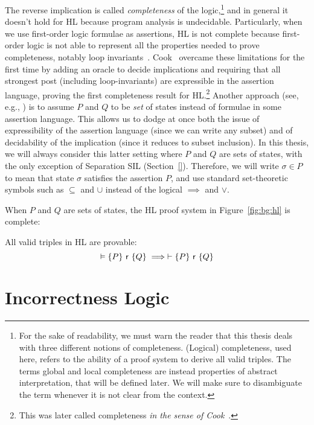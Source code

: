 The reverse implication is called \emph{completeness} of the logic,\footnote{For the sake of readability, we must warn the reader that this thesis deals with three different notions of completeness. (Logical) completeness, used here, refers to the ability of a proof system to derive all valid triples. The terms global and local completeness are instead properties of abstract interpretation, that will be defined later. We will make sure to disambiguate the term whenever it is not clear from the context.} and in general it doesn't hold for HL because program analysis is undecidable. Particularly, when we use first-order logic formulae as assertions, HL is not complete because first-order logic is not able to represent all the properties needed to prove completeness, notably loop invariants~\cite[§2.7]{Apt81}.
Cook~\cite{Cook78} overcame these limitations for the first time by adding an oracle to decide implications and requiring that all strongest post (including loop-invariants) are expressible in the assertion language, proving the first completeness result for HL.\footnote{This was later called completeness \emph{in the sense of Cook}~\cite[§2.8]{Apt81}.}
Another approach (see, e.g., \cite{CCLB12,OHearn20}) is to assume $P$ and $Q$ to be \emph{set} of states instead of formulae in some assertion language. This allows us to dodge at once both the issue of expressibility of the assertion language (since we can write any subset) and of decidability of the implication (since it reduces to subset inclusion).
In this thesis, we will always consider this latter setting where $P$ and $Q$ are sets of states, with the only exception of Separation SIL (Section~\ref{}). Therefore, we will write $\sigma \in P$ to mean that state $\sigma$ satisfies the assertion $P$, and use standard set-theoretic symbols such as $\subseteq$ and $\cup$ instead of the logical $\implies$ and $\lor$.

When $P$ and $Q$ are sets of states, the HL proof system in Figure~\ref{fig:bg:hl} is complete:

\begin{theorem}
	All valid triples in HL are provable:
	\[
	\vDash \{P\}~\mathsf{r}~\{Q\} \implies \vdash \{P\}~\mathsf{r}~\{Q\}
	\]
\end{theorem}

\section{Incorrectness Logic}\label{sec:bg:il}

